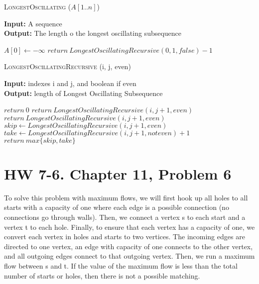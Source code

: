 \documentclass{article}
\begin{document}
\begin{algorithm} \caption{\textsc{LongestOscillating} ($A[1..n]$)}\label{alg:seb}
    {\bf Input:} A sequence\\
    {\bf Output:} The length o the longest oscillating subsequence
    \begin{algorithmic}[1]
        \State$A[0] \gets - \infty$
        \State$return\ LongestOscillatingRecursive(0, 1, false) -1$
    \end{algorithmic}
\end{algorithm}

\begin{algorithm} \caption{\textsc{LongestOscillatingRecursive} (i, j, even)}\label{alg:seb}
    {\bf Input:} indexes i and j, and boolean if even\\
    {\bf Output:} length of Longest Oscillating Subsequence
    \begin{algorithmic}[1]
            \State$return\ 0$
                \State$return\ LongestOscillatingRecursive(i, j+1, even)$
            \EndIf{}
        \Else{}
                \State$return\ LongestOscillatingRecursive(i, j+1, even)$
            \EndIf{}
        \EndIf{}
        \State$skip \gets LongestOscillatingRecursive(i, j+1, even)$
        \State$take \gets LongestOscillatingRecursive(i, j+1, not even) +1$
        \State$return\ max\{skip, take\}$
    \end{algorithmic}
\end{algorithm}


\section{HW 7-6. Chapter 11, Problem 6}

To solve this problem with maximum flows, we will first hook up all holes to all starts
with a capacity of one where each edge is a possible connection (no connections go through walls). Then, we connect a vertex s to each start and a vertex t to each hole. Finally, to ensure that each vertex has a capacity of one, we convert each vertex in holes and starts to two vertices. The incoming edges are directed to one vertex, an edge with capacity of one connects to the other vertex, and all outgoing edges connect to that outgoing vertex. Then, we run a maximum flow between s and t. If the value of the maximum flow is less than the total number of starts or holes, then there is not a possible matching.
\end{document}
